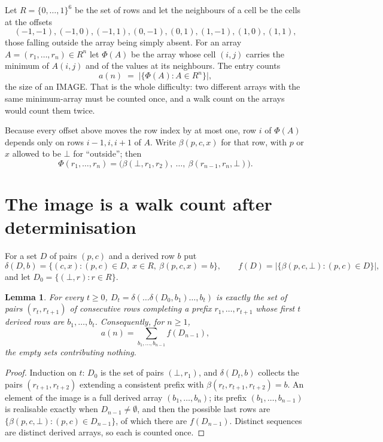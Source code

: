 \documentclass[11pt,a4paper]{article}
\theoremstyle{plain}
\newtheorem{lemma}[theorem]{Lemma}
\theoremstyle{definition}
\begin{document}
Let $R=\{0,\dots,1\}^{6}$ be the set of rows and let the neighbours of
a cell be the cells at the offsets
\[
(-1,-1), (-1,0), (-1,1), (0,-1), (0,1), (1,-1), (1,0), (1,1),
\]
those falling outside the array being simply absent. For an array
$A=(r_1,\dots,r_n)\in R^n$ let $\Phi(A)$ be the array whose cell $(i,j)$ carries the
minimum of $A(i,j)$ and of the values at its neighbours. The entry counts
\[
a(n)\;=\;\bigl|\{\Phi(A):A\in R^n\}\bigr| ,
\]
the size of an IMAGE. That is the whole difficulty: two different arrays with the same
minimum-array must be counted once, and a walk count on the arrays would count them twice.

Because every offset above moves the row index by at most one, row $i$ of
$\Phi(A)$ depends only on rows $i-1,i,i+1$ of $A$. Write $\beta(p,c,x)$ for that row, with $p$
or $x$ allowed to be $\bot$ for ``outside''; then
\[
\Phi(r_1,\dots,r_n)=\bigl(\beta(\bot,r_1,r_2),\ \dots,\ \beta(r_{n-1},r_n,\bot)\bigr).
\]

\section{The image is a walk count after determinisation}

For a set $D$ of pairs $(p,c)$ and a derived row $b$ put
\[
\delta(D,b)=\{(c,x):(p,c)\in D,\ x\in R,\ \beta(p,c,x)=b\},\qquad
f(D)=\bigl|\{\beta(p,c,\bot):(p,c)\in D\}\bigr| ,
\]
and let $D_0=\{(\bot,r):r\in R\}$.

\begin{lemma}\label{lem:det}
For every $t\ge0$, $D_t=\delta(\dots\delta(D_0,b_1)\dots,b_t)$ is exactly the set of pairs
$(r_t,r_{t+1})$ of consecutive rows completing a prefix $r_1,\dots,r_{t+1}$ whose first $t$
derived rows are $b_1,\dots,b_t$. Consequently, for $n\ge1$,
\[
a(n)=\sum_{b_1,\dots,b_{n-1}}f(D_{n-1}),
\]
the empty sets contributing nothing.
\end{lemma}

\begin{proof}
Induction on $t$: $D_0$ is the set of pairs $(\bot,r_1)$, and $\delta(D_t,b)$ collects the
pairs $(r_{t+1},r_{t+2})$ extending a consistent prefix with
$\beta(r_t,r_{t+1},r_{t+2})=b$. An element of the image is a full derived array
$(b_1,\dots,b_n)$; its prefix $(b_1,\dots,b_{n-1})$ is realisable exactly when
$D_{n-1}\neq\emptyset$, and then the possible last rows are
$\{\beta(p,c,\bot):(p,c)\in D_{n-1}\}$, of which there are $f(D_{n-1})$. Distinct sequences
are distinct derived arrays, so each is counted once.
\end{proof}
\end{document}
